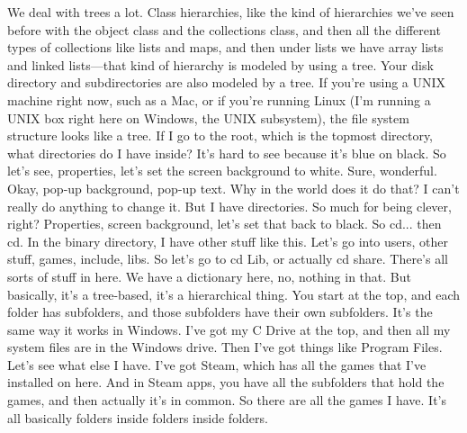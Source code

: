 We deal with trees a lot. Class hierarchies, like the kind of hierarchies we've seen before with the object class and the collections class, and then all the different types of collections like lists and maps, and then under lists we have array lists and linked lists—that kind of hierarchy is modeled by using a tree. Your disk directory and subdirectories are also modeled by a tree. If you're using a UNIX machine right now, such as a Mac, or if you're running Linux (I'm running a UNIX box right here on Windows, the UNIX subsystem), the file system structure looks like a tree. If I go to the root, which is the topmost directory, what directories do I have inside? It's hard to see because it's blue on black. So let's see, properties, let's set the screen background to white. Sure, wonderful. Okay, pop-up background, pop-up text. Why in the world does it do that? I can't really do anything to change it. But I have directories. So much for being clever, right? Properties, screen background, let's set that back to black. So cd... then cd. In the binary directory, I have other stuff like this. Let's go into users, other stuff, games, include, libs. So let's go to cd Lib, or actually cd share. There's all sorts of stuff in here. We have a dictionary here, no, nothing in that. But basically, it's a tree-based, it's a hierarchical thing. You start at the top, and each folder has subfolders, and those subfolders have their own subfolders. It's the same way it works in Windows. I've got my C Drive at the top, and then all my system files are in the Windows drive. Then I've got things like Program Files. Let's see what else I have. I've got Steam, which has all the games that I've installed on here. And in Steam apps, you have all the subfolders that hold the games, and then actually it's in common. So there are all the games I have. It's all basically folders inside folders inside folders.




